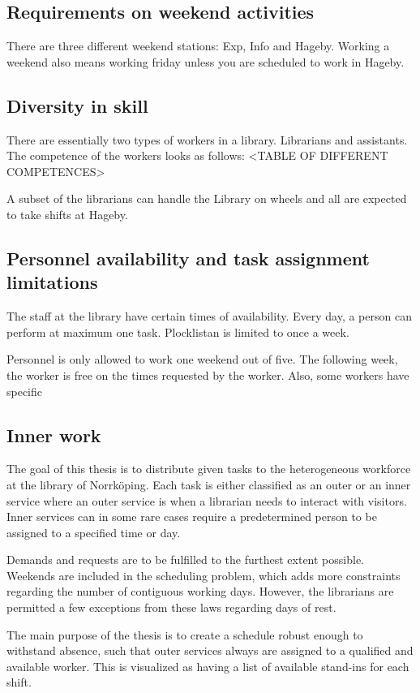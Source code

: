 \subsection{Requirements on weekend activities}
There are three different weekend stations: Exp, Info and Hageby. Working a weekend also means working friday unless you are scheduled to work in Hageby. 
\subsection{Diversity in skill}
There are essentially two types of workers in a library. Librarians and assistants. The competence of the workers looks as follows: <TABLE OF DIFFERENT COMPETENCES>

A subset of the librarians can handle the Library on wheels and all are expected to take shifts at Hageby.

\subsection{Personnel availability and task assignment limitations}
The staff at the library have certain times of availability. Every day, a person can perform at maximum one task. Plocklistan is limited to once a week.

Personnel is only allowed to work one weekend out of five. The following week, the worker is free on the times requested by the worker. Also, some workers have specific 

\subsection{Inner work} 

The goal of this thesis is to distribute given tasks to the heterogeneous workforce at the library of Norrköping. Each task is either classified as an outer or an inner service where an outer service is when a librarian needs to interact with visitors. Inner services can in some rare cases require a predetermined person to be assigned to a specified time or day.

Demands and requests are to be fulfilled to the furthest extent possible. Weekends are included in the scheduling problem, which adds more constraints regarding the number of contiguous working days. However, the librarians are permitted a few exceptions from these laws regarding days of rest.

The main purpose of the thesis is to create a schedule robust enough to withstand absence, such that outer services always are assigned to a qualified and available worker. This is visualized as having a list of available stand-ins for each shift. 

